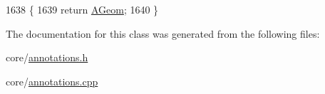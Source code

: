 \begin{DoxyCode}
1638 \{
1639     \textcolor{keywordflow}{return} \hyperlink{classOkular_1_1Annotation_af71b46e37d5f850b97d5c4de3be9aac0a2c11d328af34f5526fd9e761297fb3c2}{AGeom};
1640 \}
\end{DoxyCode}


The documentation for this class was generated from the following files\+:\begin{DoxyCompactItemize}
\item 
core/\hyperlink{annotations_8h}{annotations.\+h}\item 
core/\hyperlink{annotations_8cpp}{annotations.\+cpp}\end{DoxyCompactItemize}
